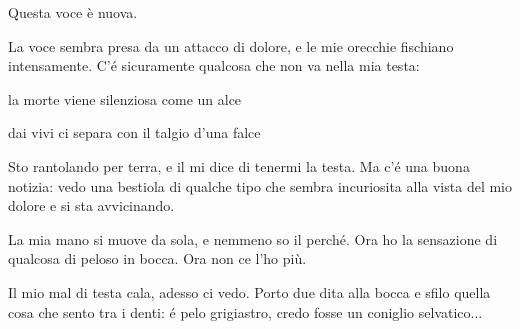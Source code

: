 

Questa voce è nuova.







La voce sembra presa da un attacco di dolore, e le mie orecchie fischiano
intensamente. C'é sicuramente qualcosa che non va nella mia testa:

\parbox{\textwidth}{
	la morte viene silenziosa come un alce

	dai vivi ci separa con il talgio d'una falce
}


Sto rantolando per terra, e il  mi dice di tenermi la testa. Ma c'é una buona notizia: vedo una
bestiola di qualche tipo che sembra incuriosita alla vista del mio dolore e si
sta avvicinando.


La mia mano si muove da sola, e nemmeno so il perché. Ora ho la sensazione di
qualcosa di peloso in bocca. Ora non ce l'ho più.

Il mio mal di testa cala, adesso ci vedo. Porto due dita alla bocca e sfilo
quella cosa che sento tra i denti: é pelo grigiastro, credo fosse un coniglio
selvatico...

